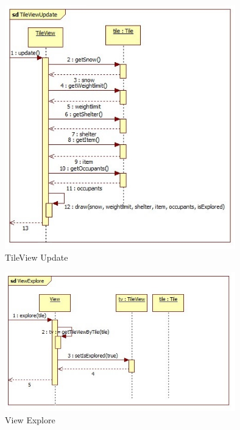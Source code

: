 \begin{figure}[H]
	\begin{center}
		\includegraphics[width=10cm]{chapters/chapter11/seq/TileView_Update.jpg}
		\caption{TileView Update}
		\label{TileView Update}
	\end{center}
\end{figure}
\begin{figure}[H]
	\begin{center}
		\includegraphics[width=10cm]{chapters/chapter11/seq/View_Explore.jpg}
		\caption{View Explore}
		\label{View Explore}
	\end{center}
\end{figure}
